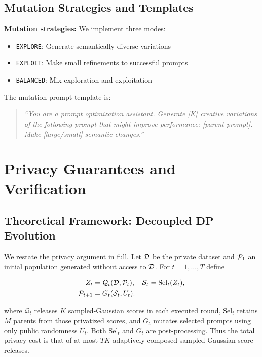\subsection{Mutation Strategies and Templates}
\textbf{Mutation strategies:} We implement three modes:
\begin{itemize}
    \item \texttt{EXPLORE}: Generate semantically diverse variations
    \item \texttt{EXPLOIT}: Make small refinements to successful prompts
    \item \texttt{BALANCED}: Mix exploration and exploitation
\end{itemize}

\noindent The mutation prompt template is:
\begin{quote}
\textit{``You are a prompt optimization assistant. Generate [K] creative variations of the following prompt that might improve performance: [parent prompt]. Make [large/small] semantic changes.''}
\end{quote}

\section{Privacy Guarantees and Verification}
\label{sec:appendix:privacy_details}



\subsection{Theoretical Framework: Decoupled DP Evolution}
We restate the privacy argument in full. Let $\mathcal{D}$ be the private dataset and $\mathcal{P}_1$ an initial population generated without access to $\mathcal{D}$. For $t=1,\dots,T$ define

\begin{align*}
  Z_t &= \mathcal{Q}_t(\mathcal{D}, \mathcal{P}_t), &
  \mathcal{S}_t &= \mathrm{Sel}_t(Z_t), \\
  \mathcal{P}_{t+1} &= G_t(\mathcal{S}_t, U_t). &&
\end{align*}

\noindent where $\mathcal{Q}_t$ releases $K$ sampled-Gaussian scores in each executed round, $\mathrm{Sel}_t$ retains $M$ parents from those privatized scores, and $G_t$ mutates selected prompts using only public randomness $U_t$. Both $\mathrm{Sel}_t$ and $G_t$ are post-processing. Thus the total privacy cost is that of at most $TK$ adaptively composed sampled-Gaussian score releases.


